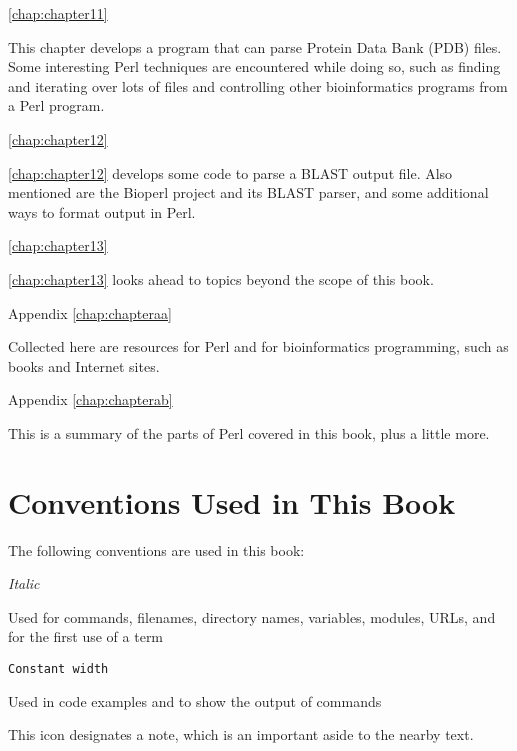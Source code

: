 \autoref{chap:chapter11}
\begin{adjustwidth}{1cm}{0cm}
This chapter develops a program that can parse Protein Data Bank (PDB) files. Some interesting Perl techniques are encountered while doing so, such as finding and iterating over lots of files and controlling other bioinformatics programs from a Perl program.
\end{adjustwidth}

\autoref{chap:chapter12}
\begin{adjustwidth}{1cm}{0cm}
\autoref{chap:chapter12} develops some code to parse a BLAST output file. Also mentioned are the Bioperl project and its BLAST parser, and some additional ways to format output in Perl.
\end{adjustwidth}

\autoref{chap:chapter13}
\begin{adjustwidth}{1cm}{0cm}
\autoref{chap:chapter13} looks ahead to topics beyond the scope of this book.
\end{adjustwidth}

Appendix \autoref{chap:chapteraa}
\begin{adjustwidth}{1cm}{0cm}
Collected here are resources for Perl and for bioinformatics programming, such as books and Internet sites.
\end{adjustwidth}

Appendix \autoref{chap:chapterab}
\begin{adjustwidth}{1cm}{0cm}
This is a summary of the parts of Perl covered in this book, plus a little more.
\end{adjustwidth}

\section*{Conventions Used in This Book}
The following conventions are used in this book:

\textit{Italic}
\begin{adjustwidth}{1cm}{0cm}
Used for commands, filenames, directory names, variables, modules, URLs, and for the first use of a term 
\end{adjustwidth}

\texttt{Constant width}
\begin{adjustwidth}{1cm}{0cm}
Used in code examples and to show the output of commands
\end{adjustwidth}

\begin{adjustwidth}{2cm}{2cm}
This icon designates a note, which is an important aside to the nearby text.
\end{adjustwidth}

